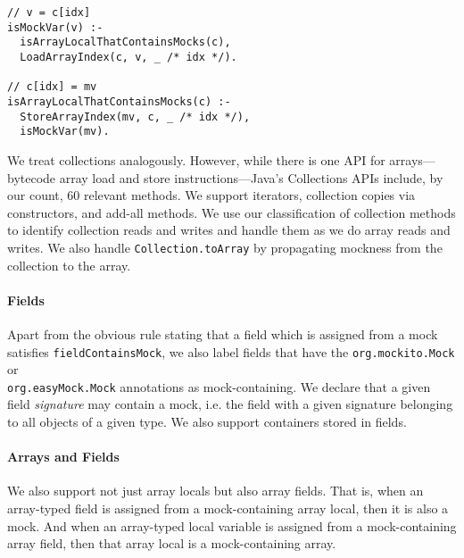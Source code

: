 \begin{lstlisting}[basicstyle=\ttfamily\small,numbers=none,caption={Rules for handling arrays.},
basicstyle=\scriptsize\ttfamily, framesep=4.5mm, framexleftmargin=1.0mm, captionpos=b, label=lis:array-rule, escapechar=!]
// v = c[idx]
isMockVar(v) :-
  isArrayLocalThatContainsMocks(c),
  LoadArrayIndex(c, v, _ /* idx */).

// c[idx] = mv
isArrayLocalThatContainsMocks(c) :-
  StoreArrayIndex(mv, c, _ /* idx */),
  isMockVar(mv).
\end{lstlisting}

We treat collections analogously. However, while there is one API for arrays---bytecode array load and store instructions---Java's Collections APIs include, by our count, 60 relevant methods. We support iterators, collection copies via constructors, and add-all methods. We use our classification of collection methods to identify collection reads and writes and handle them as we do array reads and writes. We also handle {\tt Collection.toArray} by propagating mockness from the collection to the array.%

\paragraph{Fields} Apart from the obvious rule stating that a field which is assigned from a mock satisfies {\tt fieldContainsMock}, we also label fields that have the {\tt org.mockito.Mock} or \\{\tt org.easyMock.Mock} annotations as mock-containing. We declare that a given field \emph{signature} may contain a mock, i.e. the field with a given signature belonging to all objects of a given type. We also support containers stored in fields.

\paragraph{Arrays and Fields} We also support not just array locals but also array fields. That is, when an array-typed field is assigned from a mock-containing array local, then it is also a mock. And when an array-typed local variable is assigned from a mock-containing array field, then that array local is a mock-containing array.




